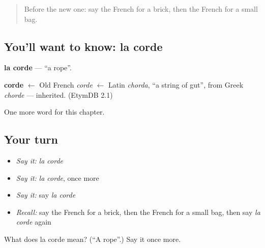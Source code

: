 \begin{quote}
Before the new one: say the French for a brick, then the French for a small bag.
\end{quote}

\subsection*{You'll want to know: la corde}
\textbf{la corde} — \textquotedblleft{}a rope\textquotedblright{}.

\begin{cousinweb}
\textbf{corde} $\leftarrow$ Old French \emph{corde} $\leftarrow$ Latin \emph{chorda}, \textquotedblleft{}a string of gut\textquotedblright{}, from Greek \emph{chorde} — inherited. (EtymDB 2.1)
\end{cousinweb}

\begin{grammarlens}[title={What you've built}]
One more word for this chapter.
\end{grammarlens}

\subsection*{Your turn}
\begin{itemize}
\raggedright
  \item \emph{Say it:} \emph{la corde}
  \item \emph{Say it:} \emph{la corde}, once more
  \item \emph{Say it:} say \emph{la corde}
  \item \emph{Recall:} say the French for a brick, then the French for a small bag, then say \emph{la corde} again
\end{itemize}

\begin{tcolorbox}[breakable,colback=teal!4,colframe=teal!35!black,title={Before you move on}]
What does la corde mean? (\textquotedblleft{}A rope\textquotedblright{}.) Say it once more.
\end{tcolorbox}
